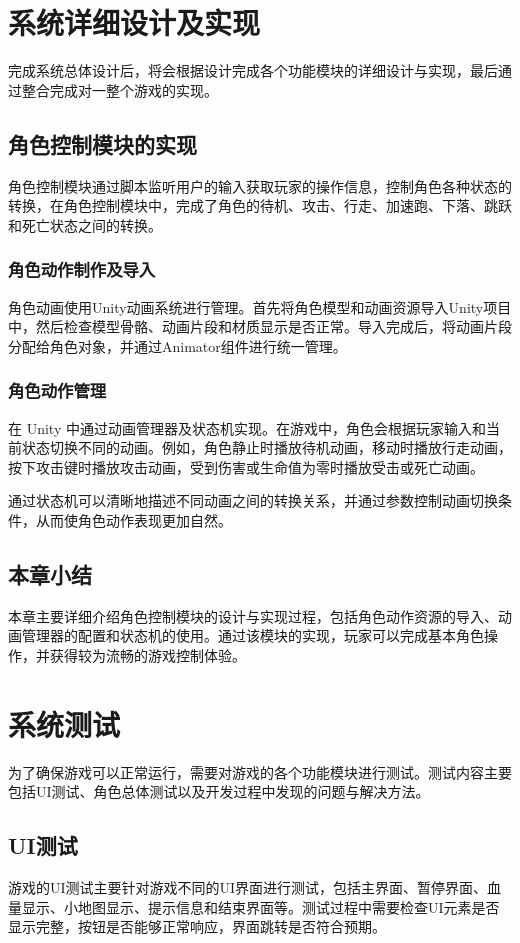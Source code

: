 \documentclass[12pt]{graduate-design-manual}
\begin{document}
\section{系统详细设计及实现}
完成系统总体设计后，将会根据设计完成各个功能模块的详细设计与实现，最后通过整合完成对一整个游戏的实现。

\subsection{角色控制模块的实现}
角色控制模块通过脚本监听用户的输入获取玩家的操作信息，控制角色各种状态的转换，在角色控制模块中，完成了角色的待机、攻击、行走、加速跑、下落、跳跃和死亡状态之间的转换。

\subsubsection{角色动作制作及导入}
角色动画使用Unity动画系统进行管理。首先将角色模型和动画资源导入Unity项目中，然后检查模型骨骼、动画片段和材质显示是否正常。导入完成后，将动画片段分配给角色对象，并通过Animator组件进行统一管理。

\subsubsection{角色动作管理}
在 Unity 中通过动画管理器及状态机实现。在游戏中，角色会根据玩家输入和当前状态切换不同的动画。例如，角色静止时播放待机动画，移动时播放行走动画，按下攻击键时播放攻击动画，受到伤害或生命值为零时播放受击或死亡动画。

通过状态机可以清晰地描述不同动画之间的转换关系，并通过参数控制动画切换条件，从而使角色动作表现更加自然。

\subsection{本章小结}
本章主要详细介绍角色控制模块的设计与实现过程，包括角色动作资源的导入、动画管理器的配置和状态机的使用。通过该模块的实现，玩家可以完成基本角色操作，并获得较为流畅的游戏控制体验。

\section{系统测试}
为了确保游戏可以正常运行，需要对游戏的各个功能模块进行测试。测试内容主要包括UI测试、角色总体测试以及开发过程中发现的问题与解决方法。

\subsection{UI测试}
游戏的UI测试主要针对游戏不同的UI界面进行测试，包括主界面、暂停界面、血量显示、小地图显示、提示信息和结束界面等。测试过程中需要检查UI元素是否显示完整，按钮是否能够正常响应，界面跳转是否符合预期。
\end{document}
